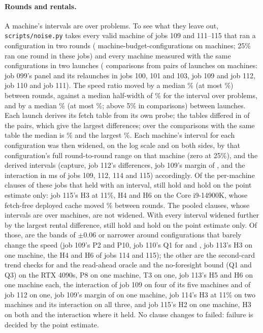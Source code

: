 \paragraph{Rounds and rentals.} A machine's intervals are over problems. To see what they leave out,
\texttt{scripts/noise.py} takes every valid machine of jobs 109 and 111--115 that ran a configuration in two
rounds (\nzRoundN{} machine-budget-configurations on \nzRoundMachines{} machines; 25\% ran one round in these jobs) and every
machine measured with the same configurations in two launches (\nzRentalN{} comparisons from \nzRentalPairs{} pairs of
launches on \nzRentalMachines{} machines: job 099's panel and its relaunches in jobs 100, 101 and 103, job 109 and job
112, job 110 and job 111). The speed ratio moved by a median \nzRoundMed\% (at most \nzRoundMax\%) between rounds, against
a median half-width of \nzHalfWidthMed\% for the interval over problems, and by a median \nzRentalMed\% (at most
\nzRentalMax\%; above 5\% in \nzRentalOverFive{} comparisons) between launches. Each launch derives its fetch table from
its own probe; the tables differed in \nzRentalTableDiff{} of the \nzRentalPairs{} pairs, which give the largest
differences; over the \nzRentalSameN{} comparisons with the same table the median is \nzRentalSameMed\% and the largest
\nzRentalSameMax\%. Each machine's interval for each configuration was then widened, on the log scale and on both sides,
by that configuration's full round-to-round range on that machine (zero at 25\%), and the derived intervals (capture,
job 112's differences, job 109's margin of \MinOne, and the interaction in ms of jobs 109, 112, 114 and 115)
accordingly. Of the \nzHeldCI{} per-machine clauses
of these jobs that held with an interval, \nzStillHeld{} still hold and \nzMovedWord{} hold on the point estimate only:
job 115's H3 at 11\%, H4 and H6 on the Core i9-14900K, whose fetch-free deployed cache moved \dqInterNegBaseZeroMove\%
between rounds. The \nzPooled{} pooled clauses, whose intervals are over machines, are not widened. With every interval widened
further by the largest rental difference, \nzRentalStillHeld{} still hold and \nzRentalMoved{} hold on the point estimate
only. Of those, \nzRentalMovedNarrow{} are the bands of $\pm$0.06 or narrower around configurations that barely change
the speed (job 109's P2 and P10, job 110's Q1 for \DepOne{} and \MinTwo, job 113's H3 on one machine, the H4 and H6
of jobs 114 and 115); the other
\nzRentalMovedOther{} are the second-card trend checks for \MinOne{} and the read-ahead oracle and the no-foresight bound
(Q1 and Q3) on the RTX 4090s, P8 on one machine, T3 on one, job 113's H5 and H6 on one machine each, the interaction of job 109 on four of its five machines and of job 112 on
one, job 109's margin of \MinOne{} on one machine, job 114's H3 at 11\% on two machines and its interaction on all
three, and job 115's H2 on one machine, H3 on both and the interaction where it held. No clause changes to failed: failure is decided by the point estimate.

